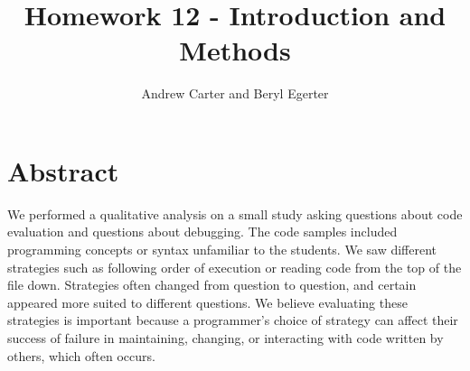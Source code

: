 \documentclass{article}
\title{Homework 12 - Introduction and Methods}
\author{Andrew Carter and Beryl Egerter}
\begin{document}
\maketitle
\section{Abstract}


We performed a qualitative analysis on a small study asking questions about code evaluation and questions about debugging.
The code samples included programming concepts or syntax unfamiliar to the students.
We saw different strategies such as following order of execution or reading code from the top of the file down. Strategies often changed from question to question, and certain appeared more suited to different questions.
We believe evaluating these strategies is important because a programmer's choice of strategy can affect their success of failure in maintaining, changing, or interacting with code written by others, which often occurs. 


\end{document}
